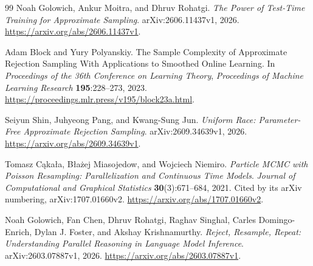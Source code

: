 \documentclass[11pt]{article}
\theoremstyle{definition}\newtheorem{definition}[theorem]{Definition}
\theoremstyle{remark}\newtheorem{remark}[theorem]{Remark}
\begin{document}


\begin{thebibliography}{99}
 Noah Golowich, Ankur Moitra, and Dhruv Rohatgi.
\emph{The Power of Test-Time Training for Approximate Sampling}.
arXiv:2606.11437v1, 2026.
\url{https://arxiv.org/abs/2606.11437v1}.

 Adam Block and Yury Polyanskiy.
The Sample Complexity of Approximate Rejection Sampling With Applications to Smoothed Online Learning.
In \emph{Proceedings of the 36th Conference on Learning Theory},
\emph{Proceedings of Machine Learning Research} \textbf{195}:228--273, 2023.
\url{https://proceedings.mlr.press/v195/block23a.html}.

 Seiyun Shin, Juhyeong Pang, and Kwang-Sung Jun.
\emph{Uniform Race: Parameter-Free Approximate Rejection Sampling}.
arXiv:2609.34639v1, 2026.
\url{https://arxiv.org/abs/2609.34639v1}.

 Tomasz C\k{a}ka\l{}a, B\l{}a\.{z}ej Miasojedow, and Wojciech Niemiro.
\emph{Particle MCMC with Poisson Resampling: Parallelization and Continuous Time Models}.
\emph{Journal of Computational and Graphical Statistics} \textbf{30}(3):671--684, 2021. Cited by its arXiv numbering, arXiv:1707.01660v2.
\url{https://arxiv.org/abs/1707.01660v2}.

 Noah Golowich, Fan Chen, Dhruv Rohatgi, Raghav Singhal, Carles Domingo-Enrich, Dylan J. Foster, and Akshay Krishnamurthy.
\emph{Reject, Resample, Repeat: Understanding Parallel Reasoning in Language Model Inference}.
arXiv:2603.07887v1, 2026.
\url{https://arxiv.org/abs/2603.07887v1}.
\end{thebibliography}
\end{document}
